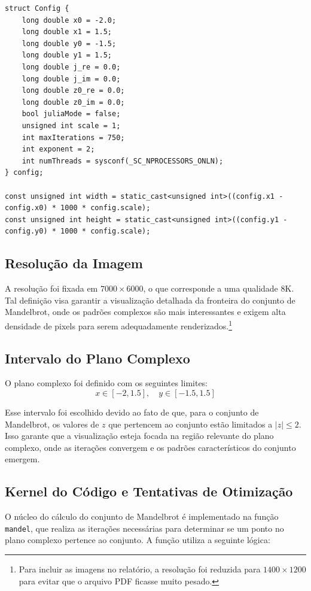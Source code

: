 \begin{lstlisting}[caption=Constantes principais]
struct Config {
    long double x0 = -2.0;
    long double x1 = 1.5;
    long double y0 = -1.5;
    long double y1 = 1.5;
    long double j_re = 0.0;
    long double j_im = 0.0;
    long double z0_re = 0.0;
    long double z0_im = 0.0;
    bool juliaMode = false;
    unsigned int scale = 1;
    int maxIterations = 750;
    int exponent = 2;
    int numThreads = sysconf(_SC_NPROCESSORS_ONLN);
} config;

const unsigned int width = static_cast<unsigned int>((config.x1 - config.x0) * 1000 * config.scale);
const unsigned int height = static_cast<unsigned int>((config.y1 - config.y0) * 1000 * config.scale);
\end{lstlisting}

\subsection{Resolução da Imagem}
A resolução foi fixada em \( 7000 \times 6000 \), o que corresponde a uma qualidade 8K. Tal definição visa garantir a visualização detalhada da fronteira do conjunto de Mandelbrot, onde os padrões complexos são mais interessantes e exigem alta densidade de pixels para serem adequadamente renderizados.\footnote{Para incluir as imagens no relatório, a resolução foi reduzida para  \( 1400 \times 1200 \) para evitar que o arquivo PDF ficasse muito pesado.}

\subsection{Intervalo do Plano Complexo}

O plano complexo foi definido com os seguintes limites:
\[
x \in [-2, 1.5], \quad y \in [-1.5, 1.5]
\]

Esse intervalo foi escolhido devido ao fato de que, para o conjunto de Mandelbrot, os valores de \( z \) que pertencem ao conjunto estão limitados a \( |z| \leq 2 \). Isso garante que a visualização esteja focada na região relevante do plano complexo, onde as iterações convergem e os padrões característicos do conjunto emergem.


\subsection{Kernel do Código e Tentativas de Otimização}

O núcleo do cálculo do conjunto de Mandelbrot é implementado na função \texttt{mandel}\cite{intel-fractal-code}, que realiza as iterações necessárias para determinar se um ponto no plano complexo pertence ao conjunto. A função utiliza a seguinte lógica:

